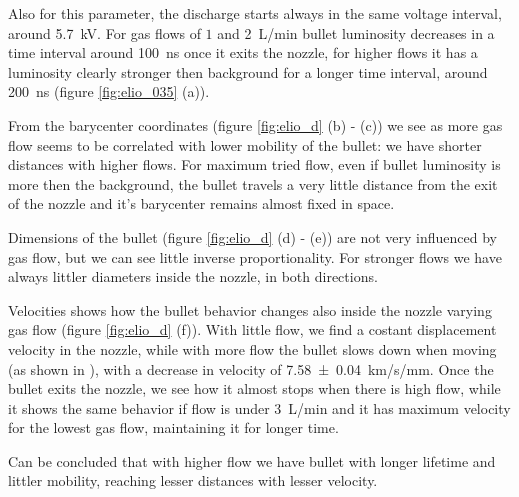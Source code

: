 Also for this parameter, the discharge starts always in the same voltage interval, around \SI{5.7}{\kilo\volt}. For gas flows of $\num{1}$ and \SI{2}{\liter/\minute} bullet luminosity decreases in a time interval around \SI{100}{\nano\second} once it exits the nozzle, for higher flows it has a luminosity clearly stronger then background for a longer time interval, around \SI{200}{\nano\second} (figure \ref{fig:elio_035} (a)).

From the barycenter coordinates (figure \ref{fig:elio_d} (b) - (c)) we see as more gas flow seems to be correlated with lower mobility of the bullet: we have shorter distances with higher flows. For maximum tried flow, even if bullet luminosity is more then the background, the bullet travels a very little distance from the exit of the nozzle and it's barycenter remains almost fixed in space.

Dimensions of the bullet (figure \ref{fig:elio_d} (d) - (e)) are not very  influenced by gas flow, but we can see little inverse proportionality. For stronger flows we have always littler diameters inside the nozzle, in both directions.

Velocities shows how the bullet behavior changes also inside the nozzle varying gas flow (figure \ref{fig:elio_d} (f)). With little flow, we find a costant displacement velocity in the nozzle, while with more flow the bullet slows down when moving (as shown in \cite{Jarrige_2010}), with a decrease in velocity of \SI{7.58(4)}{\kilo\meter/\second/\milli\meter}.
Once the bullet exits the nozzle, we see how it almost stops when there is high flow, while it shows the same behavior if flow is under \SI{3}{\liter/\minute} and it has maximum velocity for the lowest gas flow, maintaining it for longer time.


Can be concluded that with higher flow we have bullet with longer lifetime and littler mobility, reaching lesser distances with lesser velocity.


